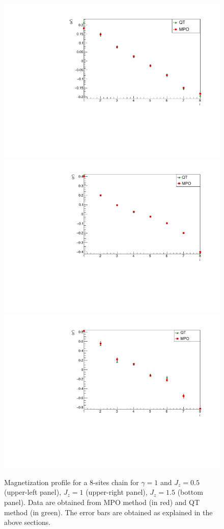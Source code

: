 \begin{figure}[H]
\centering
        \includegraphics[scale=0.35]{Figures/LMComparison_8sJ10505.pdf}
        \includegraphics[scale=0.35]{Figures/LMComparison_8sJ1051.pdf}
        \includegraphics[scale=0.35]{Figures/LMComparison_8sJ10515.pdf}
    \captionsetup{width=1.\linewidth}
    \caption{Magnetization profile for a 8-sites chain for $\gamma = 1$ and $J_z = 0.5$ (upper-left panel), $J_z = 1$ (upper-right panel), $J_z = 1.5$ (bottom panel). Data are obtained from MPO method (in red) and QT method (in green). The error bars are obtained as explained in the above sections.}
    \label{fig:LM_comparison_QTvsMPO}
\end{figure}